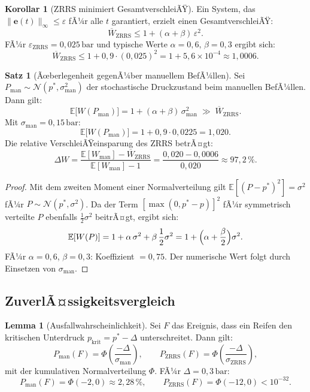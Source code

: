 ﻿\documentclass[a4paper,12pt]{article}
\theoremstyle{definition}
\newtheorem{satz}{Satz}
\newtheorem{lemma}{Lemma}
\newtheorem{korollar}{Korollar}
\begin{document}
\begin{korollar}[ZRRS minimiert GesamtverschleiÃŸ]
Ein System, das $\|\mathbf{e}(t)\|_\infty \leq \varepsilon$ fÃ¼r alle $t$ garantiert,
erzielt einen GesamtverschleiÃŸ:
\[
    \overline{W}_{\text{ZRRS}} \leq 1 + (\alpha + \beta)\,\varepsilon^2.
\]
FÃ¼r $\varepsilon_{\text{ZRRS}} = 0{,}025\,\text{bar}$ und typische Werte
$\alpha = 0{,}6,\, \beta = 0{,}3$ ergibt sich:
\[
    \overline{W}_{\text{ZRRS}} \leq 1 + 0{,}9 \cdot (0{,}025)^2
    = 1 + 5{,}6 \times 10^{-4} \approx 1{,}0006.
\]
\end{korollar}

\begin{satz}[Ãœberlegenheit gegenÃ¼ber manuellem BefÃ¼llen]
\label{satz:vergleich}
Sei $P_{\text{man}} \sim \mathcal{N}(p^*, \sigma_{\text{man}}^2)$ der stochastische
Druckzustand beim manuellen BefÃ¼llen. Dann gilt:
\[
    \mathbb{E}\bigl[W(P_{\text{man}})\bigr]
    = 1 + (\alpha + \beta)\,\sigma_{\text{man}}^2
    \;\gg\;
    \overline{W}_{\text{ZRRS}}.
\]
Mit $\sigma_{\text{man}} = 0{,}15\,\text{bar}$:
\[
    \mathbb{E}\bigl[W(P_{\text{man}})\bigr]
    = 1 + 0{,}9 \cdot 0{,}0225 = 1{,}020.
\]
Die relative VerschleiÃŸeinsparung des ZRRS betrÃ¤gt:
\[
    \Delta W = \frac{\mathbb{E}[W_{\text{man}}] - \overline{W}_{\text{ZRRS}}}
                    {\mathbb{E}[W_{\text{man}}] - 1}
    = \frac{0{,}020 - 0{,}0006}{0{,}020} \approx 97{,}2\,\%.
\]
\end{satz}

\begin{proof}
Mit dem zweiten Moment einer Normalverteilung gilt
$\mathbb{E}[(P - p^*)^2] = \sigma^2$ fÃ¼r $P \sim \mathcal{N}(p^*, \sigma^2)$.
Da der Term $[\max(0, p^* - p)]^2$ fÃ¼r symmetrisch verteilte $P$ ebenfalls
$\frac{1}{2}\sigma^2$ beitrÃ¤gt, ergibt sich:
\[
    \mathbb{E}[W(P)] = 1 + \alpha\,\sigma^2 + \beta\,\frac{1}{2}\sigma^2
    = 1 + \Bigl(\alpha + \frac{\beta}{2}\Bigr)\sigma^2.
\]
FÃ¼r $\alpha = 0{,}6$, $\beta = 0{,}3$: Koeffizient $= 0{,}75$.
Der numerische Wert folgt durch Einsetzen von $\sigma_{\text{man}}$.
\end{proof}

\subsection{ZuverlÃ¤ssigkeitsvergleich}

\begin{lemma}[Ausfallwahrscheinlichkeit]
\label{lem:ausfall}
Sei $F$ das Ereignis, dass ein Reifen den kritischen Unterdruck
$p_{\text{krit}} = p^* - \Delta$ unterschreitet. Dann gilt:
\[
    P_{\text{man}}(F) = \Phi\!\left(\frac{-\Delta}{\sigma_{\text{man}}}\right),
    \qquad
    P_{\text{ZRRS}}(F) = \Phi\!\left(\frac{-\Delta}{\sigma_{\text{ZRRS}}}\right),
\]
mit der kumulativen Normalverteilung $\Phi$. FÃ¼r $\Delta = 0{,}3\,\text{bar}$:
\[
    P_{\text{man}}(F) = \Phi(-2{,}0) \approx 2{,}28\,\%,
    \qquad
    P_{\text{ZRRS}}(F) = \Phi(-12{,}0) < 10^{-32}.
\]
\end{lemma}
\end{document}
